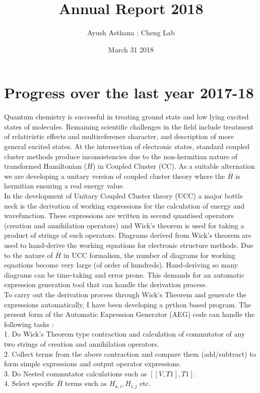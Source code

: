 \documentclass[11pt]{article}   	%
\begin{document}
\title{Annual Report 2018}
\author{Ayush Asthana : Cheng Lab}
\date{March 31 2018}							%

\maketitle

\section{Progress over the last year 2017-18}%
Quantum chemistry is successful in treating ground state and low lying excited states of molecules. Remaining scientific challenges in the field include treatment of relativistic effects and multireference character, and description of more general excited states. At the intersection of electronic states, standard coupled cluster methods produce inconsistencies due to the non-hermitian nature of transformed Hamiltonian ($\bar{H}$) in Coupled Cluster (CC). As a suitable alternation we are developing a unitary version of coupled cluster theory where the $\bar{H}$ is hermitian ensuring a real energy value.\\ 

In the development of Unitary Coupled Cluster theory (UCC) a major bottle neck is the derivation of working expressions for the calculation of energy and wavefunction. These expressions are written in second quantised operators (creation and annihilation operators) and Wick's theorem is used for taking a product of strings of such operators. Diagrams derived from Wick's theorem are used to hand-derive the working equations for electronic structure methods. Due to the nature of $\bar{H}$ in UCC formalism, the number of diagrams for working equations become very large (of order of hundreds). Hand-deriving so many diagrams can be time-taking and error prone. This demands for an automatic expression generation tool that can handle the derivation process.\\

To carry out the derivation process through Wick's Theorem and generate the expressions automatically, I have been developing a python based program. The present form of the Automatic Expression Generator (AEG) code can handle the following tasks : \\
1. Do Wick's Theorem type contraction and calculation of commutator of any two strings of creation and annihilation operators. \\
2. Collect terms from the above contraction and compare them (add/subtract) to form simple expressions and output operator expressions.\\
3. Do Nested commutator calculations such as $[[V,T1],T1]$.\\
4. Select specific $\bar{H}$ terms such as $H_{a,i}, H_{i,j}$ etc.  \\
\end{document}
